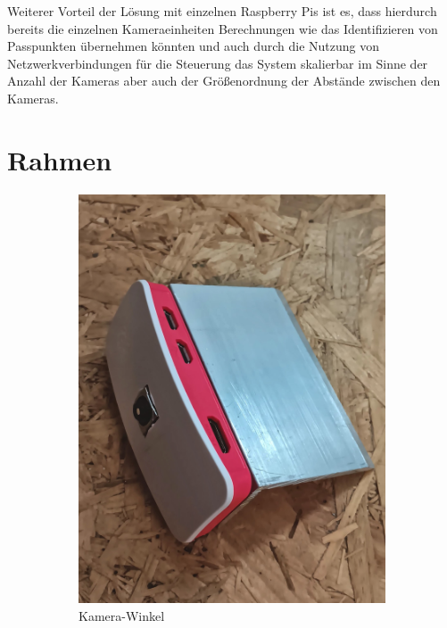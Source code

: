 \documentclass[./00PhotoBox.tex]{subfiles}
\begin{document}
Weiterer Vorteil der Lösung mit einzelnen Raspberry Pis ist es, dass hierdurch bereits die einzelnen Kameraeinheiten Berechnungen wie das Identifizieren von Passpunkten übernehmen könnten und auch durch die Nutzung von Netzwerkverbindungen für die Steuerung das System skalierbar im Sinne der Anzahl der Kameras aber auch der Größenordnung der Abstände zwischen den Kameras.

\section{Rahmen}

\begin{figure}
    \centering
    \begin{subfigure}{0.45\textwidth}
        \includegraphics[height=0.9\linewidth]{./img/aluwinkel.jpg}
        \centering
        \caption{Kamera-Winkel} %
        \label{img:aluwinkel} %
    \end{subfigure}
    \begin{subfigure}{0.45\textwidth}

\end{subfigure}
\end{figure}
\end{document}

